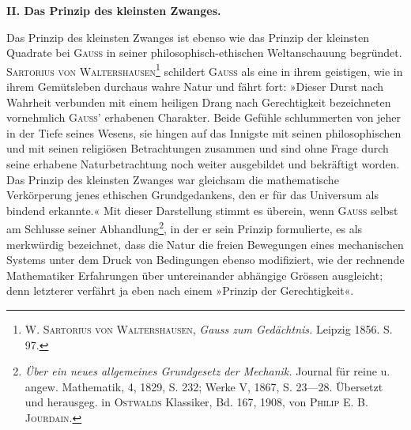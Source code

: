 \clearpage\begingroup{}
\makeatletter\tagsleft@true\let\veqno\@@leqno\makeatother
\renewcommand{\thefootnote}{\arabic{footnote})}\setcounter{footnote}{28}
\begin{center}{\bfseries II. Das Prinzip des kleinsten Zwanges.}\\[5pt]
\end{center}
\noindent\hspace*{\parindent}Das Prinzip des kleinsten Zwanges ist ebenso wie das Prinzip der kleinsten
Quadrate bei \textsc{Gauss} in seiner philosophisch-ethischen Weltanschauung begründet.
\textsc{Sartorius von Waltershausen}\footnote{W. \textsc{Sartorius von Waltershausen}, \textit{Gauss zum Gedächtnis.} Leipzig 1856. S. 97.} schildert \textsc{Gauss} als eine in ihrem
geistigen, wie in ihrem Gemütsleben durchaus wahre Natur und fährt fort:
»Dieser Durst nach Wahrheit verbunden mit einem heiligen Drang nach Gerechtigkeit
bezeichneten vornehmlich \textsc{Gauss}’ erhabenen Charakter. Beide Gefühle
schlummerten von jeher in der Tiefe seines Wesens, sie hingen auf das
Innigste mit seinen philosophischen und mit seinen religiösen Betrachtungen
zusammen und sind ohne Frage durch seine erhabene Naturbetrachtung noch
weiter ausgebildet und bekräftigt worden. Das Prinzip des kleinsten Zwanges
war gleichsam die mathematische Verkörperung jenes ethischen Grundgedankens,
\clearpage{}
\noindent den er für das Universum als bindend erkannte.« Mit dieser Darstellung
stimmt es überein, wenn \textsc{Gauss} selbst am Schlusse seiner Abhandlung\footnote{\textit{Über ein neues allgemeines Grundgesetz der Mechanik.} Journal für reine u. angew. Mathematik,
4, 1829, S. 232; Werke V, 1867, S. 23—28. Übersetzt und herausgeg. in \textsc{Ostwalds} Klassiker, Bd. 167,
1908, von \textsc{Philip E. B. Jourdain}.}, in
der er sein Prinzip formulierte, es als merkwürdig bezeichnet, dass die Natur
die freien Bewegungen eines mechanischen Systems unter dem Druck von
Bedingungen ebenso modifiziert, wie der rechnende Mathematiker Erfahrungen
über untereinander abhängige Grössen ausgleicht; denn letzterer verfährt ja
eben nach einem »Prinzip der Gerechtigkeit«.

